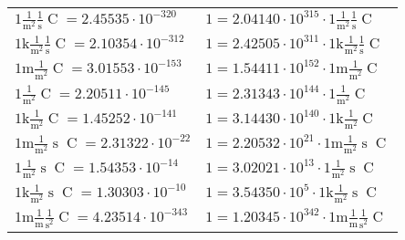 \begin{center}
\begin{longtable}{l l}
{\color{black}$1 \bm{\mathrm{ }}\frac1{\operatorname{m}^2}\frac1{\operatorname{s}}{\operatorname{C}}{} = 2.45535\cdot10^{-320} $}   & {\color{black}$ 1 = 2.04140\cdot10^{315} \cdot 1 \bm{\mathrm{ }}\frac1{\operatorname{m}^2}\frac1{\operatorname{s}}{\operatorname{C}}{}$}  \\
{\color{gray}$1 \bm{\mathrm{ k}}\frac1{\operatorname{m}^2}\frac1{\operatorname{s}}{\operatorname{C}}{} = 2.10354\cdot10^{-312} $}   & {\color{gray}$ 1 = 2.42505\cdot10^{311} \cdot 1 \bm{\mathrm{ k}}\frac1{\operatorname{m}^2}\frac1{\operatorname{s}}{\operatorname{C}}{}$}  \\
{\color{gray}$1 \bm{\mathrm{ m}}\frac1{\operatorname{m}^2}{}{\operatorname{C}}{} = 3.01553\cdot10^{-153} $}   & {\color{gray}$ 1 = 1.54411\cdot10^{152} \cdot 1 \bm{\mathrm{ m}}\frac1{\operatorname{m}^2}{}{\operatorname{C}}{}$}  \\
{\color{black}$1 \bm{\mathrm{ }}\frac1{\operatorname{m}^2}{}{\operatorname{C}}{} = 2.20511\cdot10^{-145} $}   & {\color{black}$ 1 = 2.31343\cdot10^{144} \cdot 1 \bm{\mathrm{ }}\frac1{\operatorname{m}^2}{}{\operatorname{C}}{}$}  \\
{\color{gray}$1 \bm{\mathrm{ k}}\frac1{\operatorname{m}^2}{}{\operatorname{C}}{} = 1.45252\cdot10^{-141} $}   & {\color{gray}$ 1 = 3.14430\cdot10^{140} \cdot 1 \bm{\mathrm{ k}}\frac1{\operatorname{m}^2}{}{\operatorname{C}}{}$}  \\
{\color{gray}$1 \bm{\mathrm{ m}}\frac1{\operatorname{m}^2}{\operatorname{s}}{\operatorname{C}}{} = 2.31322\cdot10^{-22} $}   & {\color{gray}$ 1 = 2.20532\cdot10^{21} \cdot 1 \bm{\mathrm{ m}}\frac1{\operatorname{m}^2}{\operatorname{s}}{\operatorname{C}}{}$}  \\
{\color{black}$1 \bm{\mathrm{ }}\frac1{\operatorname{m}^2}{\operatorname{s}}{\operatorname{C}}{} = 1.54353\cdot10^{-14} $}   & {\color{black}$ 1 = 3.02021\cdot10^{13} \cdot 1 \bm{\mathrm{ }}\frac1{\operatorname{m}^2}{\operatorname{s}}{\operatorname{C}}{}$}  \\
{\color{gray}$1 \bm{\mathrm{ k}}\frac1{\operatorname{m}^2}{\operatorname{s}}{\operatorname{C}}{} = 1.30303\cdot10^{-10} $}   & {\color{gray}$ 1 = 3.54350\cdot10^{5} \cdot 1 \bm{\mathrm{ k}}\frac1{\operatorname{m}^2}{\operatorname{s}}{\operatorname{C}}{}$}  \\
{\color{gray}$1 \bm{\mathrm{ m}}\frac1{\operatorname{m}}\frac1{\operatorname{s}^2}{\operatorname{C}}{} = 4.23514\cdot10^{-343} $}   & {\color{gray}$ 1 = 1.20345\cdot10^{342} \cdot 1 \bm{\mathrm{ m}}\frac1{\operatorname{m}}\frac1{\operatorname{s}^2}{\operatorname{C}}{}$}  \\

\end{longtable}
\end{center}
